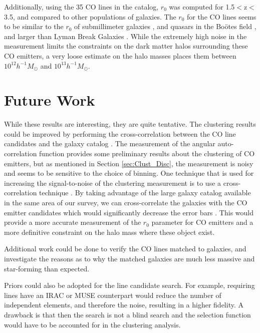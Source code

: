 \documentclass[twoside,single]{lion-msc}
\begin{document}
Additionally, using the 35 CO lines in the catalog, $r_0$ was computed for 1.5$<$z$<$3.5, and compared to other populations of galaxies. The $r_0$ for the CO lines seems to be similar to the $r_0$ of submillimeter galaxies \cite{10.1111/j.1365-2966.2011.20303.x}, and quasars in the Bo\"otes field \cite{hickox2011clustering}, and larger than Lyman Break Galaxies \cite{adelberger2005spatial}. While the extremely high noise in the measurement limits the constraints on the dark matter halos surrounding these CO emitters, a very loose estimate on the halo masses places them between $10^{12} h^{-1}M_{\odot}$ and $10^{13} h^{-1}M_{\odot}$.

\section{Future Work}\label{sec:Future_Work}

While these results are interesting, they are quite tentative. The clustering results could be improved by performing the cross-correlation between the CO line candidates and the galaxy catalog \cite{hickox2011clustering, 10.1111/j.1365-2966.2011.20303.x, 10.1111/j.1365-2966.2008.14071.x}. The measurement of the angular auto-correlation function provides some preliminary results about the clustering of CO emitters, but as mentioned in Section \ref{sec:Clust_Disc}, the measurement is noisy and seems to be sensitive to the choice of binning. One technique that is used for increasing the signal-to-noise of the clustering measurement is to use a cross-correlation technique \cite{hickox2011clustering, 10.1111/j.1365-2966.2011.20303.x}. By taking advantage of the large galaxy catalog available in the same area of our survey, we can cross-correlate the galaxies with the CO emitter candidates which would significantly decrease the error bars \cite{hickox2011clustering}. This would provide a more accurate measurement of the $r_0$ parameter for CO emitters and a more definitive constraint on the halo mass where these object exist.

Additional work could be done to verify the CO lines matched to galaxies, and investigate the reasons as to why the matched galaxies are much less massive and star-forming than expected.

Priors could also be adopted for the line candidate search. For example, requiring lines have an IRAC or MUSE counterpart would reduce the number of independent elements, and therefore the noise, resulting in a higher fidelity. A drawback is that then the search is not a blind search and the selection function would have to be accounted for in the clustering analysis.
\end{document}
